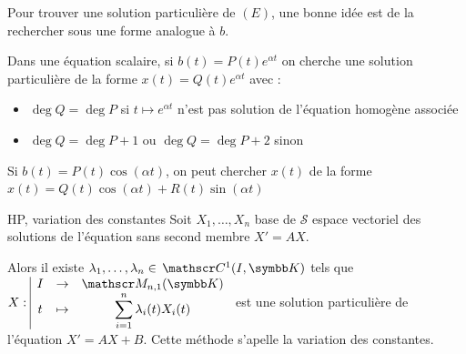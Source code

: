 \begin{remarque}
    Pour trouver une solution particulière de $(E)$, une bonne idée est de la rechercher sous 
    une forme analogue à $b$. 
\end{remarque}

\begin{exemple}
    Dans une équation scalaire, si $b(t) = P(t)e^{\alpha t}$ on cherche une solution 
    particulière de la forme $x(t) = Q(t)e^{\alpha t}$ avec : 
    \begin{itemize}
        \item $\deg Q = \deg P$ si $t \mapsto e^{\alpha t}$ n'est pas solution de l'équation homogène associée
        \item $\deg Q = \deg P + 1$ ou $\deg Q = \deg P + 2$ sinon
    \end{itemize}

    Si $b(t) = P(t) \cos (\alpha t)$, on peut chercher $x(t)$ de la forme 
    $x(t) = Q(t) \cos (\alpha t) + R(t) \sin (\alpha t)$
\end{exemple}

\begin{theoreme}{HP, variation des constantes}{}
    Soit $X_1, \dots, X_n$ base de $\mathscr S$ espace vectoriel des solutions de 
    l'équation sans second membre $X' = AX$.

    Alors il existe $\lambda_1, \dots, \lambda_n \in \mc 1(I, \K)$ tels que 
    $\fonction{X}{I}{\mathscr M_{n, 1}(\K)}{t}{\sum_{i = 1}^n \lambda_i(t) X_i(t)}$ est une solution 
    particulière de l'équation $X' = AX + B$. Cette méthode s'apelle la variation des constantes. 
\end{theoreme}


